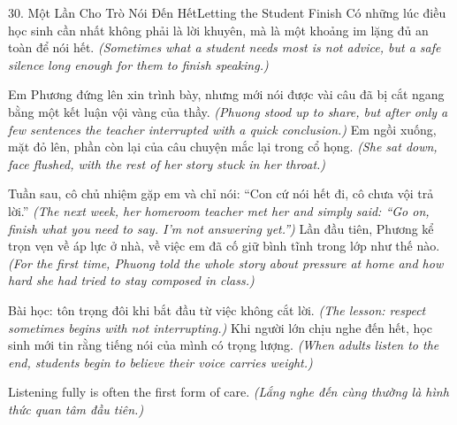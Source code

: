 \begin{truyen}{30. Một Lần Cho Trò Nói Đến Hết}{Letting the Student Finish}
Có những lúc điều học sinh cần nhất không phải là lời khuyên, mà là một khoảng im lặng đủ an toàn để nói hết.
\textit{(Sometimes what a student needs most is not advice, but a safe silence long enough for them to finish speaking.)}

Em Phương đứng lên xin trình bày, nhưng mới nói được vài câu đã bị cắt ngang bằng một kết luận vội vàng của thầy.
\textit{(Phuong stood up to share, but after only a few sentences the teacher interrupted with a quick conclusion.)}
Em ngồi xuống, mặt đỏ lên, phần còn lại của câu chuyện mắc lại trong cổ họng.
\textit{(She sat down, face flushed, with the rest of her story stuck in her throat.)}

Tuần sau, cô chủ nhiệm gặp em và chỉ nói: ``Con cứ nói hết đi, cô chưa vội trả lời.''
\textit{(The next week, her homeroom teacher met her and simply said: ``Go on, finish what you need to say. I'm not answering yet.'')}
Lần đầu tiên, Phương kể trọn vẹn về áp lực ở nhà, về việc em đã cố giữ bình tĩnh trong lớp như thế nào.
\textit{(For the first time, Phuong told the whole story about pressure at home and how hard she had tried to stay composed in class.)}

Bài học: tôn trọng đôi khi bắt đầu từ việc không cắt lời.
\textit{(The lesson: respect sometimes begins with not interrupting.)}
Khi người lớn chịu nghe đến hết, học sinh mới tin rằng tiếng nói của mình có trọng lượng.
\textit{(When adults listen to the end, students begin to believe their voice carries weight.)}
\end{truyen}

\begin{baihoc}
Listening fully is often the first form of care.
\textit{(Lắng nghe đến cùng thường là hình thức quan tâm đầu tiên.)}
\end{baihoc}

\ngancach
